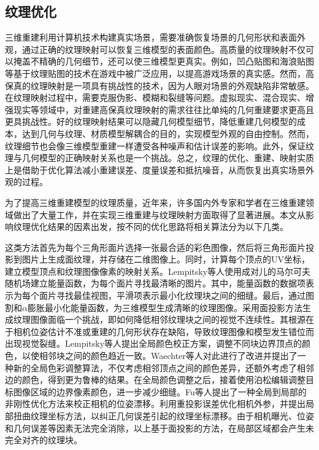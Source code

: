\subsection{纹理优化}
三维重建利用计算机技术构建真实场景，需要准确恢复场景的几何形状和表面外观，通过正确的纹理映射可以恢复三维模型的表面颜色。高质量的纹理映射不仅可以掩盖不精确的几何细节，还可以使三维模型更真实。例如，凹凸贴图和海浪贴图等基于纹理贴图的技术在游戏中被广泛应用，以提高游戏场景的真实感。然而，高保真的纹理映射是一项具有挑战性的技术，因为人眼对场景的外观缺陷非常敏感。在纹理映射过程中，需要克服伪影、模糊和裂缝等问题。虚拟现实、混合现实、增强现实等领域中，对重建高保真纹理映射的需求往往比单纯的几何重建要求更高且更具挑战性。好的纹理映射结果可以隐藏几何模型细节，降低重建几何模型的成本，达到几何与纹理、材质模型解耦合的目的，实现模型外观的自由控制。然而，纹理细节也会像三维模型重建一样遭受各种噪声和估计误差的影响。此外，保证纹理与几何模型的正确映射关系也是一个挑战。总之，纹理的优化、重建、映射实质上是借助于优化算法减小重建误差、度量误差和抵抗噪音，从而恢复出真实场景外观的过程。\par 
为了提高三维重建模型的纹理质量，近年来，许多国内外专家和学者在三维重建领域做出了大量工作，并在实现三维重建与纹理映射方面取得了显著进展。本文从影响纹理优化结果的因素出发，按不同的优化思路将相关算法分为以下几类。\par

\vspace*{2mm}这类方法首先为每个三角形面片选择一张最合适的彩色图像，然后将三角形面片投影到图片上生成面纹理，并存储在二维图像上。同时，计算每个顶点的UV坐标，建立模型顶点和纹理图像像素的映射关系。Lempitsky等人使用成对儿的马尔可夫随机场建立能量函数，为每个面片寻找最清晰的图片。其中，能量函数的数据项表示为每个面片寻找最佳视图，平滑项表示最小化纹理块之间的细缝。最后，通过图割和$\alpha$膨胀最小化能量函数，为三维模型生成清晰的纹理图像。采用面投影方法生成纹理图像面临一个挑战，即如何降低相邻纹理块之间的视觉不连续性。其根源在于相机位姿估计不准或重建的几何形状存在缺陷，导致纹理图像和模型发生错位而出现视觉裂缝。Lempitsky等人提出全局颜色校正方案，调整不同块边界顶点的颜色，以使相邻块之间的颜色趋近一致。Waechter等人对此进行了改进并提出了一种新的全局色彩调整算法，不仅考虑相邻顶点之间的颜色差异，还额外考虑了相邻边的颜色，得到更为鲁棒的结果。在全局颜色调整之后，接着使用泊松编辑调整目标图像区域的边界像素颜色，进一步减少细缝。Fu等人提出了一种全局到局部的非刚性优化方法来校正相机的位姿漂移。利用重投影误差优化相机外参，并提出局部扭曲纹理坐标方法，以纠正几何误差引起的纹理坐标漂移。由于相机曝光、位姿和几何误差等因素无法完全消除，以上基于面投影的方法，在局部区域都会产生未完全对齐的纹理块。\par


